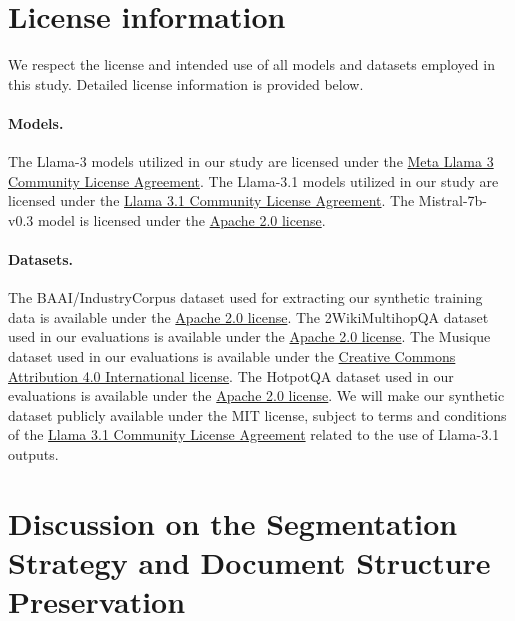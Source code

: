 \documentclass{article} %
\begin{document}
\section{License information}

We respect the license and intended use of all models and datasets employed in this study. Detailed license information is provided below.

\paragraph{Models.}
The Llama-3 models utilized in our study are licensed under the \href{https://www.llama.com/llama3/license/}{Meta Llama 3 Community License Agreement}. The Llama-3.1 models utilized in our study are licensed under the \href{https://www.llama.com/llama3_1/license/}{Llama 3.1 Community License Agreement}. The Mistral-7b-v0.3 model is licensed under the \href{https://huggingface.co/datasets/choosealicense/licenses/blob/main/markdown/apache-2.0.md}{Apache 2.0 license}. 

\paragraph{Datasets.}
The BAAI/IndustryCorpus dataset used for extracting our synthetic training data is available under the \href{https://huggingface.co/datasets/choosealicense/licenses/blob/main/markdown/apache-2.0.md}{Apache 2.0 license}. 
The 2WikiMultihopQA dataset used in our evaluations is available under the \href{https://github.com/Alab-NII/2wikimultihop/blob/main/LICENSE}{Apache 2.0 license}. The Musique dataset used in our evaluations is available under the \href{https://github.com/StonyBrookNLP/musique/blob/main/LICENSE}{Creative Commons Attribution 4.0 International license}. The HotpotQA dataset used in our evaluations is available under the \href{https://github.com/hotpotqa/hotpot/blob/master/LICENSE.txt}{Apache 2.0 license}.
We will make our synthetic dataset publicly available under the MIT license, subject to terms and conditions of the \href{https://www.llama.com/llama3_1/license/}{Llama 3.1 Community License Agreement} related to the use of Llama-3.1 outputs. 


\section{Discussion on the Segmentation Strategy and Document Structure Preservation}
\end{document}
